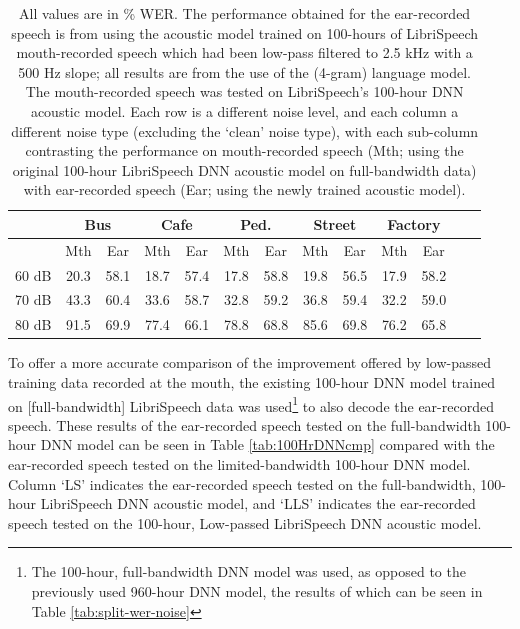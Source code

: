 \begin{table}[h]
\begin{center}
\begin{tabular}{| c || c | c | c | c | c | c | c | c | c | c | c | c |} \hline
      & \multicolumn{2}{|c|}{Bus} & \multicolumn{2}{|c|}{Cafe} & \multicolumn{2}{|c|}{Ped.} & \multicolumn{2}{|c|}{Street} & \multicolumn{2}{|c|}{Factory} \\ \hline
      & Mth & Ear & Mth & Ear & Mth & Ear & Mth & Ear & Mth & Ear \\ \hline\hline
60 dB & 20.3 & 58.1 & 18.7 & 57.4 & 17.8 & 58.8 & 19.8 & 56.5 & 17.9 & 58.2  \\ \hline
70 dB & 43.3 & 60.4 & 33.6 & 58.7 & 32.8 & 59.2 & 36.8 & 59.4 & 32.2 & 59.0  \\ \hline
80 dB & 91.5 & 69.9 & 77.4 & 66.1 & 78.8 & 68.8 & 85.6 & 69.8 & 76.2 & 65.8  \\ \hline
\end{tabular}
\end{center}
\caption{All values are in \% WER. The performance obtained for the ear-recorded speech is from using the acoustic model trained on 100-hours of LibriSpeech mouth-recorded speech which had been low-pass filtered to 2.5 kHz with a 500 Hz slope; all results are from the use of the (4-gram) language model.  The mouth-recorded speech was tested on LibriSpeech's 100-hour DNN acoustic model.  Each row is a different noise level, and each column a different noise type (excluding the `clean' noise type), with each sub-column contrasting the performance on mouth-recorded speech (Mth; using the original 100-hour LibriSpeech DNN acoustic model on full-bandwidth data) with ear-recorded speech (Ear; using the newly trained acoustic model).}\label{tab:retrainedDNN}
\end{table}

To offer a more accurate comparison of the improvement offered by low-passed training data recorded at the mouth, the existing 100-hour DNN model trained on [full-bandwidth] LibriSpeech data was used\footnote{The 100-hour, full-bandwidth DNN model was used, as opposed to the previously used 960-hour DNN model, the results of which can be seen in Table \ref{tab:split-wer-noise}} to also decode the ear-recorded speech.  These results of the ear-recorded speech tested on the full-bandwidth 100-hour DNN model can be seen in Table \ref{tab:100HrDNNcmp} compared with the ear-recorded speech tested on the limited-bandwidth 100-hour DNN model.  Column `LS' indicates the ear-recorded speech tested on the full-bandwidth, 100-hour LibriSpeech DNN acoustic model, and `LLS' indicates the ear-recorded speech tested on the 100-hour, Low-passed LibriSpeech DNN acoustic model.

